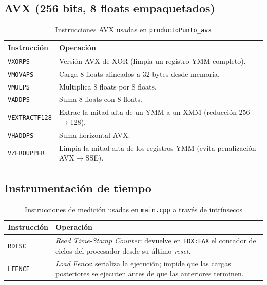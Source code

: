 \documentclass[12pt, letterpaper]{article}
\begin{document}
\subsection{AVX (256 bits, 8 floats empaquetados)}

\begin{table}[H]
    \centering
    \begin{tabular}{@{}lp{10cm}@{}}
        \toprule
        \textbf{Instrucción} & \textbf{Operación} \\
        \midrule
        \texttt{VXORPS}       & Versión AVX de XOR (limpia un registro YMM completo). \\
        \texttt{VMOVAPS}      & Carga 8 floats alineados a 32 bytes desde memoria. \\
        \texttt{VMULPS}       & Multiplica 8 floats por 8 floats. \\
        \texttt{VADDPS}       & Suma 8 floats con 8 floats. \\
        \texttt{VEXTRACTF128} & Extrae la mitad alta de un YMM a un XMM (reducción 256$\to$128). \\
        \texttt{VHADDPS}      & Suma horizontal AVX. \\
        \texttt{VZEROUPPER}   & Limpia la mitad alta de los registros YMM (evita penalización AVX$\to$SSE). \\
        \bottomrule
    \end{tabular}
    \caption{Instrucciones AVX usadas en \texttt{productoPunto\_avx}}
\end{table}

\subsection{Instrumentación de tiempo}

\begin{table}[H]
    \centering
    \begin{tabular}{@{}lp{10cm}@{}}
        \toprule
        \textbf{Instrucción} & \textbf{Operación} \\
        \midrule
        \texttt{RDTSC}  & \textit{Read Time-Stamp Counter}: devuelve en \texttt{EDX:EAX} el contador de ciclos del procesador desde su último \textit{reset}. \\
        \texttt{LFENCE} & \textit{Load Fence}: serializa la ejecución; impide que las cargas posteriores se ejecuten antes de que las anteriores terminen. \\
        \bottomrule
    \end{tabular}
    \caption{Instrucciones de medición usadas en \texttt{main.cpp} a través de intrínsecos}
\end{table}
\end{document}
